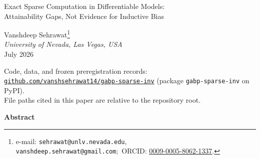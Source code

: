 \documentclass[11pt]{article}
\theoremstyle{plain}
\theoremstyle{remark}
\begin{document}
\begin{titlepage}
\renewcommand{\thefootnote}{\fnsymbol{footnote}}
\begin{center}
\vspace*{0.5em}

{\LARGE Exact Sparse Computation in Differentiable Models:\\[0.45em]
Attainability Gaps, Not Evidence for Inductive Bias\par}

\vspace{2.3em}

{\large Vanshdeep Sehrawat\footnote{e-mail:
  \texttt{sehrawat@unlv.nevada.edu}, \texttt{vanshdeep.sehrawat@gmail.com};\ ORCID:
  \href{https://orcid.org/0009-0005-8062-1337}{0009-0005-8062-1337}.}}\\[0.35em]
{\itshape University of Nevada, Las Vegas, USA}\\[0.35em]
{\small July 2026}

\vspace{0.9em}

{\small Code, data, and frozen preregistration records:
\href{https://github.com/vanshsehrawat14/gabp-sparse-inv}{\texttt{github.com/vanshsehrawat14/gabp-sparse-inv}}
(package \texttt{gabp-sparse-inv} on PyPI).\\
File paths cited in this paper are relative to the repository root.}

\vspace{1.15em}

{\bfseries Abstract}
\end{center}


\end{titlepage}
\end{document}
